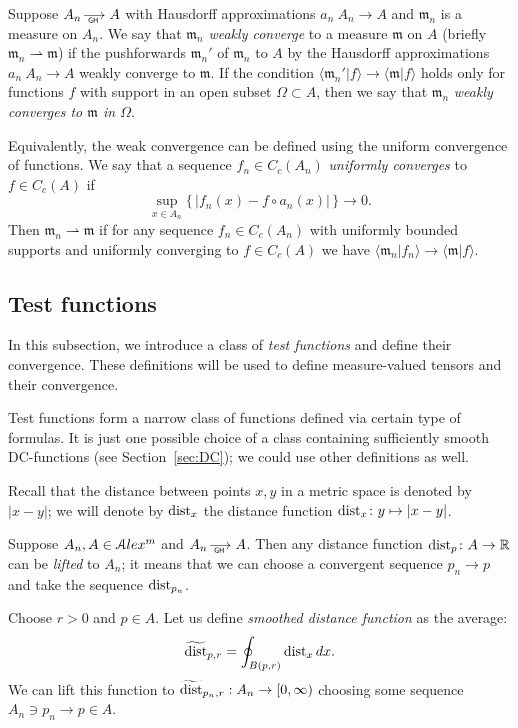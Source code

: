 Suppose $A_n\GHto A$ with Hausdorff approximations $a_n\:A_n\to A$ and
$\mathfrak m_n$ is a measure on $A_n$.
We say that $\mathfrak m_n$ \emph{weakly converge} to a measure $\mathfrak m$ on $A$ (briefly $\mathfrak m_n\rightharpoonup \mathfrak m$) if the pushforwards $\mathfrak m_n'$ of $\mathfrak m_n$ to $A$  by the Hausdorff approximations $a_n\:A_n\to A$ weakly converge to 
$\mathfrak m$.
If the condition $\langle \mathfrak m_n'|f\rangle \to \langle \mathfrak m|f\rangle $ holds only for functions $f$ with support in an open subset $\Omega\subset A$, then we say that $\mathfrak m_n$ \emph{weakly converges to $\mathfrak m$ in $\Omega$}.

Equivalently, the weak convergence can be defined using the uniform convergence of functions.
We say that  a sequence $f_n\in C_c(A_n)$
\emph{uniformly converges} to $f\in C_c(A)$
if 
\[\sup_{x\in A_n}\{\,|f_n(x)-f\circ a_n(x)|\,\}\to 0.\]
Then  $\mathfrak m_n\rightharpoonup \mathfrak m$
if for any sequence $f_n\in C_c(A_n)$
with uniformly bounded supports and
uniformly converging to $f\in C_c(A)$
we have $\langle \mathfrak m_n|f_n\rangle \to \langle \mathfrak m|f\rangle $.


\subsection{Test functions}

In this subsection, we introduce a class of \emph{test functions} and define their convergence.
These definitions will be used to define measure-valued tensors and their convergence.

Test functions form a narrow class of functions defined via certain type of formulas.
It is just one possible choice of a class containing sufficiently  smooth DC-functions (see Section~\ref{sec:DC}); we could use other definitions as well.

Recall that the distance between points $x,y$ in a metric space is denoted by $|x-y|$;
we will denote by $\operatorname{\rm dist}_x$ the distance function $\operatorname{\rm dist}_x\colon y\mapsto |x-y|$.

Suppose $A_n, A\in \mathcal{A}lex^m$ and  $A_n\GHto A$.
Then any distance function $\dist_p\:A\zz\to\RR$ can be \emph{lifted} to $A_n$;
it means that we can choose a convergent sequence $p_n\to p$ and take the
sequence $\operatorname{\rm dist}_{p_n}$.

Choose $r>0$ and $p\in A$.
Let us define \emph{smoothed distance function} as the average:
$$\widetilde{\operatorname{\rm dist}}_{p,r} =\oint_{B(p,r)} \operatorname{\rm dist}_{x}dx.$$ 
We can lift this function to
$\widetilde{\operatorname{\rm dist}}_{p_n,r}:A_n\to [0,\infty)$
choosing some  sequence $A_n\ni p_n\to p\in A$.

